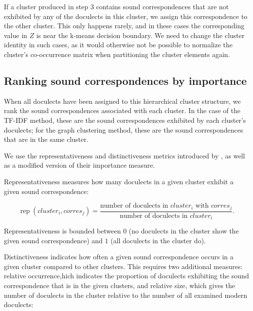 \documentclass[a4paper]{article}
\begin{document}

If a cluster produced in step 3 contains
sound correspondences that are not exhibited
by any of the doculects in this cluster,
we assign this correspondence to the other cluster.
This only happens rarely, and in these cases the corresponding
value in $Z$ is near the k-means decision boundary.
We need to change the cluster identity in such cases,
as it would otherwise not be possible to normalize
the cluster's co-occurrence matrix when partitioning
the cluster elements again.

\subsection{Ranking sound correspondences by importance}

When all doculects have been assigned to this hierarchical cluster structure,
we rank the sound correspondences associated with each cluster.
In the case of the TF-IDF method, these are
the sound correspondences exhibited by each cluster's doculects;
for the graph clustering method,
these are the sound correspondences that are in the same cluster.

We use the representativeness and distinctiveness metrics
introduced by \citet{wieling2011bipartite},
as well as a modified version of their importance measure.

Representativeness measures how many doculects in a given cluster
exhibit a given sound correspondence:

\begin{equation*}
\operatorname{rep}(cluster_i, corres_j) = 
\frac{\text{number of doculects in } cluster_i \text{ with }  corres_j}
{\text{number of doculects in }  cluster_i}
.
\end{equation*}

Representativeness is bounded between
$0$ (no doculects in the cluster show the given sound correspondence)
and $1$ (all doculects in the cluster do).

Distinctiveness indicates how often a given sound correspondence
occurs in a given cluster compared to other clusters. 
This requires two additional measures:
relative occurrence,hich indicates the proportion
of doculects exhibiting the sound correspondence
that is in the given clusters,
and relative size, which gives the number of doculects 
in the cluster relative to the number of all examined modern doculects:
\end{document}
